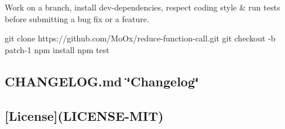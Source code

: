 Work on a branch, install dev-\/dependencies, respect coding style \& run tests before submitting a bug fix or a feature.


\begin{DoxyCode}
git clone https://github.com/MoOx/reduce-function-call.git
git checkout -b patch-1
npm install
npm test
\end{DoxyCode}


\subsection*{C\+H\+A\+N\+G\+E\+L\+O\+G.\+md \char`\"{}\+Changelog\char`\"{}}

\subsection*{\mbox{[}License\mbox{]}(L\+I\+C\+E\+N\+S\+E-\/\+M\+IT)}